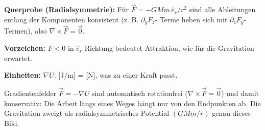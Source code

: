 \begin{kontrolle}
\textbf{Querprobe (Radialsymmetrie):} Für $\vec F=-GMm\,\hat e_r/r^2$ sind
alle Ableitungen entlang der Komponenten konsistent (z. B. $\partial_y F_z$-
Terme heben sich mit $\partial_z F_y$-Termen), also $\nabla\times\vec F=\vec 0$.
\checkmark

\textbf{Vorzeichen:} $F<0$ in $\hat e_r$-Richtung bedeutet Attraktion,
wie für die Gravitation erwartet. \checkmark

\textbf{Einheiten:} $\nabla U$: [J/m] = [N], was zu einer Kraft passt. \checkmark
\end{kontrolle}

\begin{merksatz}
Gradientenfelder $\vec F=-\nabla U$ sind automatisch rotationfrei
($\nabla\times\vec F=\vec 0$) und damit konservativ: Die Arbeit längs
eines Weges hängt nur von den Endpunkten ab. Die Gravitation zweigt als
radialsymmetrisches Potential $(GMm/r)$ genau dieses Bild.
\end{merksatz}
